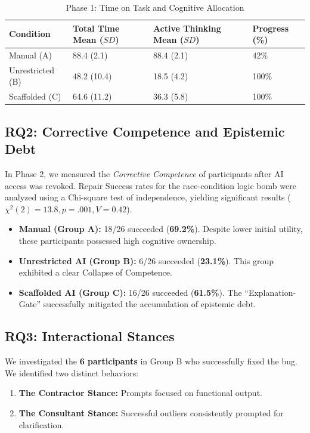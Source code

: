 \documentclass[sigconf]{acmart}
\begin{document}

\begin{table}[ht]
  \caption{Phase 1: Time on Task and Cognitive Allocation}
  \label{tab:time_results}
  \small
  \begin{tabularx}{\columnwidth}{lCCC}
    \toprule
    Condition & Total Time Mean ($SD$) & Active Thinking Mean ($SD$) & Progress (\%)\\
    \midrule
    Manual (A) & 88.4 (2.1) & 88.4 (2.1) & 42\%\\
    Unrestricted (B) & 48.2 (10.4) & 18.5 (4.2) & 100\%\\
    Scaffolded (C) & 64.6 (11.2) & 36.3 (5.8) & 100\%\\
    \bottomrule
  \end{tabularx}
\end{table}

\subsection{RQ2: Corrective Competence and Epistemic Debt}
In Phase 2, we measured the \textit{Corrective Competence} of participants after AI access was revoked. Repair Success rates for the race-condition logic bomb were analyzed using a Chi-square test of independence, yielding significant results ($\chi^2(2) = 13.8, p = .001, V = 0.42$).

\begin{itemize}
    \item \textbf{Manual (Group A):} 18/26 succeeded (\textbf{69.2\%}). Despite lower initial utility, these participants possessed high cognitive ownership.
    \item \textbf{Unrestricted AI (Group B):} 6/26 succeeded (\textbf{23.1\%}). This group exhibited a clear Collapse of Competence. 
    \item \textbf{Scaffolded AI (Group C):} 16/26 succeeded (\textbf{61.5\%}). The ``Explanation-Gate'' successfully mitigated the accumulation of epistemic debt.
\end{itemize}

\subsection{RQ3: Interactional Stances}
We investigated the \textbf{6 participants} in Group B who successfully fixed the bug. We identified two distinct behaviors:
\begin{enumerate}
    \item \textbf{The Contractor Stance:} Prompts focused on functional output.
    \item \textbf{The Consultant Stance:} Successful outliers consistently prompted for clarification.
\end{enumerate}
\end{document}
